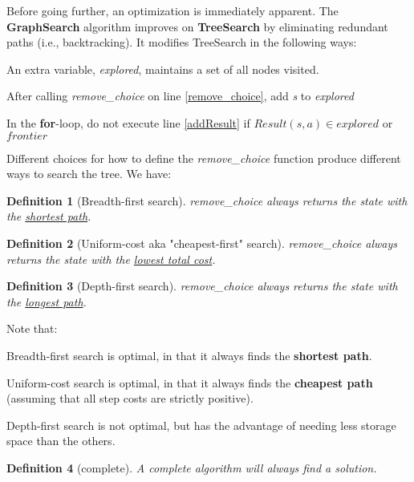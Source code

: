\documentclass[10pt,a4paper]{article}
\newtheorem{defin}{Definition}
\newenvironment{itemize_packed}{
\begin{itemize}
\setlength{\itemsep}{0pt}
\setlength{\parskip}{0pt}
}{\end{itemize}}
\begin{document}
Before going further, an optimization is immediately apparent. The \textbf{GraphSearch} algorithm improves on \textbf{TreeSearch} by eliminating redundant paths (i.e., backtracking). It modifies TreeSearch in the following ways:
\begin{itemize_packed}
\item An extra variable, \emph{explored}, maintains a set of all nodes visited.
\item After calling \emph{remove\_choice} on line \ref{remove_choice}, add \emph{s} to \emph{explored}
\item In the \textbf{for}-loop, do not execute line \ref{addResult} if $Result(s,a) \in explored$ or $frontier$
\end{itemize_packed}

Different choices for how to define the \emph{remove\_choice} function produce different ways to search the tree. We have:

\begin{defin}[Breadth-first search]
\emph{remove\_choice} always returns the state with the \underline{shortest path}.
\end{defin}

\begin{defin}[Uniform-cost aka "cheapest-first" search]
\emph{remove\_choice} always returns the state with the \underline{lowest total cost}.
\end{defin}

\begin{defin}[Depth-first search]
\emph{remove\_choice} always returns the state with the \underline{longest path}.
\end{defin}

Note that:

\begin{itemize_packed}
\item Breadth-first search is optimal, in that it always finds the \textbf{shortest path}.
\item Uniform-cost search is optimal, in that it always finds the \textbf{cheapest path} (assuming that all step costs are strictly positive).
\item Depth-first search is not optimal, but has the advantage of needing less storage space than the others.
\end{itemize_packed}

\begin{defin}[complete]
A \emph{complete} algorithm will always find a solution.
\end{defin}
\end{document}
